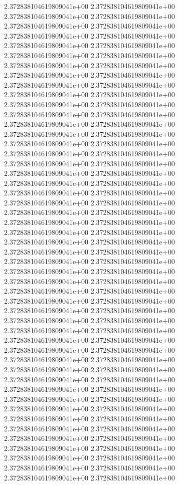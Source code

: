 2.372838104619809041e+00	2.372838104619809041e+00	2.372838104619809041e+00	2.372838104619809041e+00	2.372838104619809041e+00	2.372838104619809041e+00	2.372838104619809041e+00	2.372838104619809041e+00	2.372838104619809041e+00	2.372838104619809041e+00	2.372838104619809041e+00	2.372838104619809041e+00	2.372838104619809041e+00	2.372838104619809041e+00	2.372838104619809041e+00	2.372838104619809041e+00	2.372838104619809041e+00	2.372838104619809041e+00	2.372838104619809041e+00	2.372838104619809041e+00	2.372838104619809041e+00	2.372838104619809041e+00	2.372838104619809041e+00	2.372838104619809041e+00	2.372838104619809041e+00	2.372838104619809041e+00	2.372838104619809041e+00	2.372838104619809041e+00	2.372838104619809041e+00	2.372838104619809041e+00	2.372838104619809041e+00	2.372838104619809041e+00	2.372838104619809041e+00	2.372838104619809041e+00	2.372838104619809041e+00	2.372838104619809041e+00	2.372838104619809041e+00	2.372838104619809041e+00	2.372838104619809041e+00	2.372838104619809041e+00	2.372838104619809041e+00	2.372838104619809041e+00	2.372838104619809041e+00	2.372838104619809041e+00	2.372838104619809041e+00	2.372838104619809041e+00	2.372838104619809041e+00	2.372838104619809041e+00	2.372838104619809041e+00	2.372838104619809041e+00	2.372838104619809041e+00	2.372838104619809041e+00	2.372838104619809041e+00	2.372838104619809041e+00	2.372838104619809041e+00	2.372838104619809041e+00	2.372838104619809041e+00	2.372838104619809041e+00	2.372838104619809041e+00	2.372838104619809041e+00	2.372838104619809041e+00	2.372838104619809041e+00	2.372838104619809041e+00	2.372838104619809041e+00	2.372838104619809041e+00	2.372838104619809041e+00	2.372838104619809041e+00	2.372838104619809041e+00	2.372838104619809041e+00	2.372838104619809041e+00	2.372838104619809041e+00	2.372838104619809041e+00	2.372838104619809041e+00	2.372838104619809041e+00	2.372838104619809041e+00	2.372838104619809041e+00	2.372838104619809041e+00	2.372838104619809041e+00	2.372838104619809041e+00	2.372838104619809041e+00	2.372838104619809041e+00	2.372838104619809041e+00	2.372838104619809041e+00	2.372838104619809041e+00	2.372838104619809041e+00	2.372838104619809041e+00	2.372838104619809041e+00	2.372838104619809041e+00	2.372838104619809041e+00	2.372838104619809041e+00	2.372838104619809041e+00	2.372838104619809041e+00	2.372838104619809041e+00	2.372838104619809041e+00	2.372838104619809041e+00	2.372838104619809041e+00	2.372838104619809041e+00	2.372838104619809041e+00
